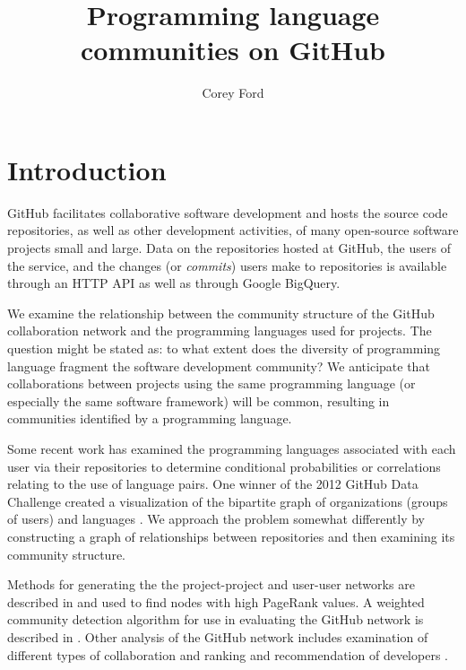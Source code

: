 \documentclass[twocolumn]{article}
\title{Programming language communities on GitHub}
\author{Corey Ford}
\begin{document}
\maketitle

\section{Introduction}

GitHub \cite{github} facilitates collaborative software development and hosts
the source code repositories, as well as other development activities, of many
open-source software projects small and large. Data on the repositories hosted
at GitHub, the users of the service, and the changes (or \textit{commits}) users
make to repositories is available through an HTTP API as well as through Google
BigQuery.

We examine the relationship between the community structure of the GitHub
collaboration network and the programming languages used for projects. The
question might be stated as: to what extent does the diversity of programming
language fragment the software development community? We anticipate that
collaborations between projects using the same programming language (or
especially the same software framework) will be common, resulting in communities
identified by a programming language.

Some recent work has examined the programming languages associated with each
user via their repositories to determine conditional probabilities \cite{doll12}
or correlations \cite{shah13} relating to the use of language pairs. One winner
of the 2012 GitHub Data Challenge created a visualization of the bipartite graph
of organizations (groups of users) and languages \cite{rodrigues12}. We approach
the problem somewhat differently by constructing a graph of relationships
between repositories and then examining its community structure.

Methods for generating the the project-project and user-user networks are
described in \cite{thung2013} and used to find nodes with high PageRank values.
A weighted community detection algorithm for use in evaluating the GitHub
network is described in \cite{marrama}. Other analysis of the GitHub network
includes examination of different types of collaboration \cite{khadke} and
ranking and recommendation of developers \cite{sarma}.
\end{document}
